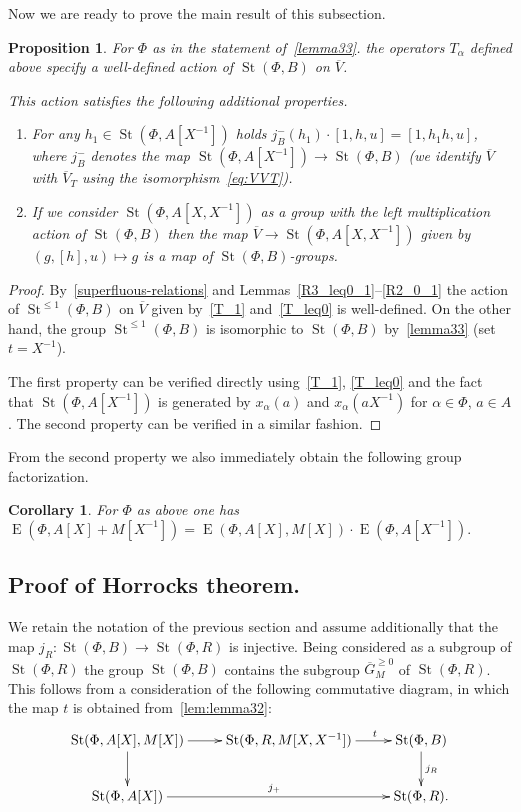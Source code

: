 \documentclass[oneside, 8pt]{amsart}
\newtheorem{prop}[lemma]{Proposition}
\newtheorem{corollary}[lemma]{Corollary}
\theoremstyle{remark}
\theoremstyle{definition}
\numberwithin{lemma}{section}
\numberwithin{prop}{section}
\numberwithin{corollary}{section}
\numberwithin{externaltheorem}{section}
\DeclareMathOperator{\St}{St}
\DeclareMathOperator{\E}{E}
\newcommand{\inv}{^{-1}}
\numberwithin{equation}{section}
\begin{document}
Now we are ready to prove the main result of this subsection.
\begin{prop} \label{prop43}
For $\Phi$ as in the statement of~\cref{lemma33}.
the operators $T_\alpha$ defined above specify a well-defined action of $\St(\Phi, B)$ on $\overline{V}$. 

This action satisfies the following additional properties.
\begin{enumerate}
 \item For any $h_1 \in \St(\Phi, A[X\inv])$ holds $j_B^-(h_1) \cdot [1, h, u] = [1, h_1 h, u]$, where $j_B^-$ denotes the map $\St(\Phi, A[X\inv]) \to \St(\Phi, B)$ (we identify $\overline{V}$ with $\overline{V}_T$ using the isomorphism~\eqref{eq:VVT}).
 \item If we consider $\St(\Phi, A[X, X\inv])$ as a group with the left multiplication action of $\St(\Phi, B)$ then the map $\overline{V} \to \St(\Phi, A[X, X\inv])$ given by $(g, [h], u) \mapsto g$ is a map of $\St(\Phi, B)$-groups.
\end{enumerate}
\end{prop}
\begin{proof} By~\cref{superfluous-relations} and Lemmas~\ref{R3_leq0_1}--\ref{R2_0_1} the action of $\St^{\leq 1}(\Phi, B)$ on $\overline{V}$ given by~\eqref{T_1} and~\eqref{T_leq0} is well-defined. On the other hand, the group $\St^{\leq 1}(\Phi, B)$ is isomorphic to $\St(\Phi, B)$ by~\cref{lemma33} (set $t = X^{-1}$).
  
The first property can be verified directly using~\eqref{T_1}, \eqref{T_leq0} and the fact that $\St(\Phi, A[X\inv])$ is generated by $x_\alpha(a)$ and $x_\alpha(aX\inv)$ for $\alpha\in\Phi$, $a\in A$. The second property can be verified in a similar fashion. \end{proof}

From the second property we also immediately obtain the following group factorization.
\begin{corollary} For $\Phi$ as above one has $\E(\Phi, A[X] + M[X\inv]) = \E(\Phi, A[X], M[X]) \cdot \E(\Phi, A[X\inv]).$ \end{corollary}

\subsection{Proof of Horrocks theorem.} \label{sec:P1glueing}
We retain the notation of the previous section and assume additionally that the map $j_R \colon \St(\Phi, B) \to \St(\Phi, R)$ is injective. 
Being considered as a subgroup of $\St(\Phi, R)$ the group $\St(\Phi, B)$ contains the subgroup $\overline{G}^{\geq 0}_M$ of $\St(\Phi, R)$. This follows from a consideration of the following commutative diagram, in which the map $t$ is obtained from~\cref{lem:lemma32}:
\[ \xymatrix{ \St(\Phi, A[X], M[X]) \ar[d] \ar[r] & \St(\Phi, R, M[X, X\inv]) \ar[r]^(.65){t} & \St(\Phi, B) \ar[d]^{j_R} \\
   \St(\Phi, A[X]) \ar[rr]^{j_+} & & \St(\Phi, R). } \]
\end{document}
